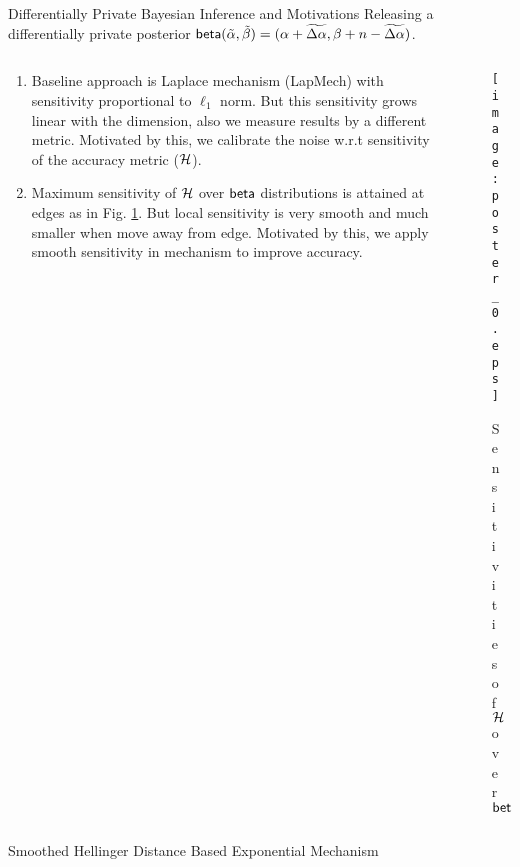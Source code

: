 \documentclass[final,hyperref={pdfpagelabels=false}]{beamer}
\begin{document}
\begin{frame}[t]
\begin{columns}[t]
\begin{column}{.485\textwidth}
\begin{block}{Differentially Private Bayesian Inference and Motivations}
Releasing a differentially private posterior $\mathsf{beta} (\tilde\alpha,\tilde\beta)=(\alpha +  \widetilde{\Delta \alpha},\beta + n - \widetilde{\Delta \alpha})$.
\begin{columns} %
\begin{column}{.69\textwidth}
\begin{enumerate}
  \item  Baseline approach is Laplace mechanism (LapMech) with sensitivity proportional to $\ell_1$ norm. But this sensitivity grows linear with the dimension, also we measure results by a different metric. Motivated by this, we calibrate the noise w.r.t sensitivity of the accuracy metric ($\mathcal{H}$). %
  \item Maximum sensitivity of $\mathcal{H}$ over $\mathsf{beta}$ distributions is attained at edges as in Fig. \ref{fig_sensitivity}. But local sensitivity is very smooth and much smaller when move away from edge. Motivated by this, we apply smooth sensitivity in mechanism to improve accuracy.
\end{enumerate}
\end{column}
\begin{column}{.28\textwidth}
\begin{figure}[ht]
\centering
\texttt{[image: poster\_0.eps]}
\caption{\footnotesize{Sensitivities of $\mathcal{H}$ over $\mathsf{beta}$}}
\label{fig_sensitivity}
\end{figure}
\end{column}
\end{columns}

\end{block}



\begin{block}{Smoothed Hellinger Distance Based Exponential Mechanism}


\end{block}
\end{column}
\end{columns}
\end{frame}
\end{document}

